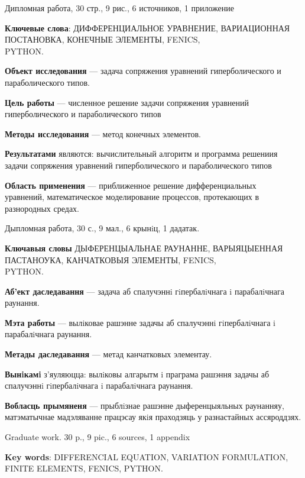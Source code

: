\pagestyle{plain}
Дипломная работа, 30 стр., 9 рис., 6 источников, 1 приложение

\textbf{Ключевые слова}: ДИФФЕРЕНЦИАЛЬНОЕ УРАВНЕНИЕ, ВАРИАЦИОННАЯ ПОСТАНОВКА, 
КОНЕЧНЫЕ ЭЛЕМЕНТЫ, FENICS, \\ PYTHON.

\textbf{Объект исследования} --- задача сопряжения уравнений гиперболического и параболического типов.

\textbf{Цель работы} --- численное решение задачи сопряжения уравнений гиперболического и параболического типов

\textbf{Методы исследования} --- метод конечных элементов.

\textbf{Результатами} являются: вычислительный алгоритм и программа решениия задачи сопряжения
уравнений гиперболического и параболического типов

\textbf{Область применения} --- приближенное решение дифференциальных \\ уравнений, математическое
моделирование процессов, протекающих в разнородных средах.


Дыпломная работа, 30 с., 9 мал., 6 крынiц, 1 дадатак.

\textbf{Ключавыя словы} ДЫФЕРЕНЦЫАЛЬНАЕ РАУНАННЕ, ВАРЫЯЦЫЕННАЯ ПАСТАНОУКА, КАНЧАТКОВЫЯ ЭЛЕМЕНТЫ,
FENICS, \\ PYTHON.

\textbf{Аб'ект даследавання} --- задача аб спалучэннi гiпербалiчнага i парабалiчнага раунання.

\textbf{Мэта работы} --- вылiковае рашэнне задачы аб спалучэннi гiпербалiчнага i парабалiчнага раунання.

\textbf{Метады даследавання} --- метад канчатковых элементау.

\textbf{Вынiкамi} з'яуляюцца: вылiковы алгарытм i праграма рашэння задачы аб спалучэннi гiпербалiчнага i парабалiчнага раунання.

\textbf{Вобласць прымяненя} --- прыблiзнае рашэнне дыференцыяльных раунанняу, матэматычнае
мадэляванне працэсау якiя праходзяць у разнастайных ассяроддзях. \\

\newpage


Graduate work. 30 p., 9 pic., 6 sources, 1 appendix

\textbf{Key words}: DIFFERENCIAL EQUATION, VARIATION FORMULATION,\\ FINITE ELEMENTS, FENICS, PYTHON.

